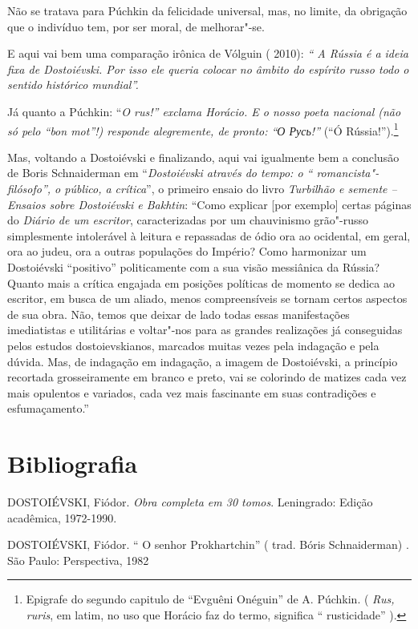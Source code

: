 Não se tratava para Púchkin da felicidade universal, mas, no limite, da
obrigação que o indivíduo tem, por ser moral, de melhorar"-se.

E aqui vai bem uma comparação irônica de Vólguin ( 2010): \emph{`` A
Rússia é a ideia fixa de Dostoiévski. Por isso ele queria colocar no
âmbito do espírito russo todo o sentido histórico mundial''.}

Já quanto a Púchkin: ``\emph{O rus!'' exclama Horácio. E o nosso poeta
nacional (não só pelo ``bon mot''!) responde alegremente, de pronto: ``О
Русь!''} (``Ó Rússia!'').\footnote{Epigrafe do segundo capitulo de
  ``Evguêni Onéguin'' de A. Púchkin. ( \emph{Rus, ruris}, em latim, no
  uso que Horácio faz do termo, significa `` rusticidade'' ).}

Mas, voltando a Dostoiévski e finalizando, aqui vai igualmente bem a
conclusão de Boris Schnaiderman em ``\emph{Dostoiévski através do tempo:
o `` romancista"-filósofo'', o público, a crítica}'', o primeiro ensaio
do livro \emph{Turbilhão e semente -- Ensaios sobre Dostoiévski e
Bakhtin}: ``Como explicar {[}por exemplo{]} certas páginas do
\emph{Diário de um escritor}, caracterizadas por um chauvinismo
grão"-russo simplesmente intolerável à leitura e repassadas de ódio ora
ao ocidental, em geral, ora ao judeu, ora a outras populações do
Império? Como harmonizar um Dostoiévski ``positivo'' politicamente com a
sua visão messiânica da Rússia? Quanto mais a crítica engajada em
posições políticas de momento se dedica ao escritor, em busca de um
aliado, menos compreensíveis se tornam certos aspectos de sua obra. Não,
temos que deixar de lado todas essas manifestações imediatistas e
utilitárias e voltar"-nos para as grandes realizações já conseguidas
pelos estudos dostoievskianos, marcados muitas vezes pela indagação e
pela dúvida. Mas, de indagação em indagação, a imagem de Dostoiévski, a
princípio recortada grosseiramente em branco e preto, vai se colorindo
de matizes cada vez mais opulentos e variados, cada vez mais fascinante
em suas contradições e esfumaçamento.''

\section{Bibliografia}

DOSTOIÉVSKI, Fiódor. \emph{Obra completa em 30 tomos}. Leningrado:
Edição acadêmica, 1972-1990.

DOSTOIÉVSKI, Fiódor. `` O senhor Prokhartchin'' ( trad. Bóris
Schnaiderman) . São Paulo: Perspectiva, 1982


